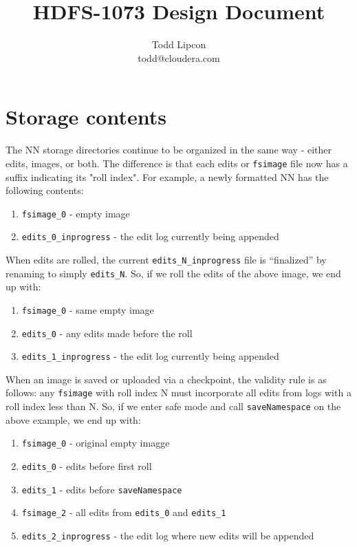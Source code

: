 \documentclass{article}
\title{HDFS-1073 Design Document}
\author{Todd Lipcon\\todd@cloudera.com}
\begin{document}
\maketitle
\tableofcontents

\section{Storage contents}

The NN storage directories continue to be organized in the same way - either edits, images, or both. The difference is that each edits or {\tt fsimage} file now has a suffix indicating its "roll index". For example, a newly formatted NN has the following contents:

\begin{enumerate}
\item {\tt fsimage\_0} - empty image
\item {\tt edits\_0\_inprogress} - the edit log currently being appended
\end{enumerate}

When edits are rolled, the current {\tt edits\_N\_inprogress} file is ``finalized'' by renaming to simply {\tt edits\_N}. So, if we roll the edits of the above image, we end up with:

\begin{enumerate}
\item {\tt fsimage\_0} - same empty image
\item {\tt edits\_0} - any edits made before the roll
\item {\tt edits\_1\_inprogress} - the edit log currently being appended
\end{enumerate}

When an image is saved or uploaded via a checkpoint, the validity rule is as follows: any {\tt fsimage} with roll index N must incorporate all edits from logs with a roll index less than N. So, if we enter safe mode and call {\tt saveNamespace} on the above example, we end up with:
\begin{enumerate}
\item  {\tt fsimage\_0} - original empty imagge
\item  {\tt edits\_0} - edits before first roll
\item  {\tt edits\_1} - edits before {\tt saveNamespace}
\item  {\tt fsimage\_2} - all edits from {\tt edits\_0} and {\tt edits\_1}
\item  {\tt edits\_2\_inprogress} - the edit log where new edits will be appended
\end{enumerate}
\end{document}
